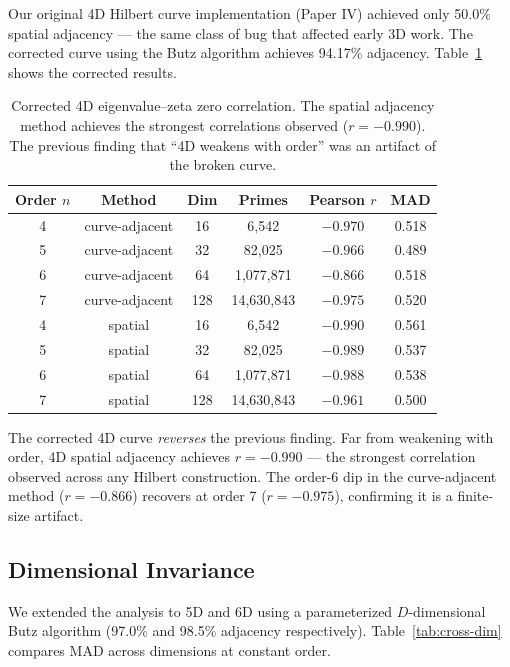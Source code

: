 \documentclass[11pt,a4paper]{article}
\begin{document}
Our original 4D Hilbert curve implementation (Paper IV) achieved only
50.0\% spatial adjacency --- the same class of bug that affected early 3D
work. The corrected curve using the Butz algorithm achieves 94.17\%
adjacency. Table~\ref{tab:4d-eigenvalue} shows the corrected results.

\begin{table}[h]
\centering
\begin{tabular}{cccccc}
\toprule
Order $n$ & Method & Dim & Primes & Pearson $r$ & MAD \\
\midrule
4 & curve-adjacent    & 16  & 6,542       & $-0.970$ & 0.518 \\
5 & curve-adjacent    & 32  & 82,025      & $-0.966$ & 0.489 \\
6 & curve-adjacent    & 64  & 1,077,871   & $-0.866$ & 0.518 \\
7 & curve-adjacent    & 128 & 14,630,843  & $-0.975$ & 0.520 \\
\midrule
4 & spatial           & 16  & 6,542       & $\mathbf{-0.990}$ & 0.561 \\
5 & spatial           & 32  & 82,025      & $\mathbf{-0.989}$ & 0.537 \\
6 & spatial           & 64  & 1,077,871   & $\mathbf{-0.988}$ & 0.538 \\
7 & spatial           & 128 & 14,630,843  & $-0.961$ & 0.500 \\
\bottomrule
\end{tabular}
\caption{Corrected 4D eigenvalue--zeta zero correlation. The spatial
adjacency method achieves the strongest correlations observed ($r =
-0.990$). The previous finding that ``4D weakens with order'' was an
artifact of the broken curve.}
\label{tab:4d-eigenvalue}
\end{table}

The corrected 4D curve \emph{reverses} the previous finding. Far from
weakening with order, 4D spatial adjacency achieves $r = -0.990$ --- the
strongest correlation observed across any Hilbert construction. The order-6
dip in the curve-adjacent method ($r = -0.866$) recovers at order 7 ($r =
-0.975$), confirming it is a finite-size artifact.

\subsection{Dimensional Invariance}
\label{sec:dimensional-invariance}

We extended the analysis to 5D and 6D using a parameterized $D$-dimensional
Butz algorithm (97.0\% and 98.5\% adjacency respectively).
Table~\ref{tab:cross-dim} compares MAD across dimensions at constant order.
\end{document}
